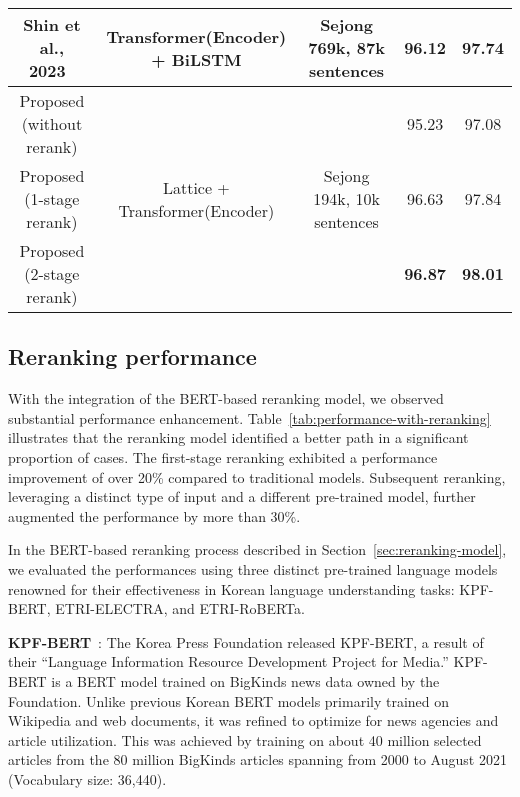 \documentclass[AMS,STIX2COL]{WileyNJD-v2}
\begin{document}
\begin{table*}[ht]
\begin{tabular*}{500pt}{@{\extracolsep\fill}ccc|cc@{\extracolsep\fill}}
            Shin et al., 2023~\cite{ShinHJ2023}   & Transformer(Encoder) + BiLSTM                   & Sejong 769k, 87k sentences                  & 96.12                      & 97.74                        \\
            \midrule
            Proposed (without rerank)             & \multirow{3}{*}{Lattice + Transformer(Encoder)} & \multirow{3}{*}{Sejong 194k, 10k sentences} & 95.23                      & 97.08                        \\
            Proposed (1-stage rerank)             & ~                                               & ~                                           & 96.63                      & 97.84                        \\
            Proposed (2-stage rerank)             & ~                                               & ~                                           & \textbf{96.87}             & \textbf{98.01}               \\
            \bottomrule
        \end{tabular*}
    \end{table*}

    \subsection{Reranking performance}\label{subsec:reranking-performance}

    With the integration of the BERT-based reranking model, we observed substantial performance enhancement.
    Table~\ref{tab:performance-with-reranking} illustrates that the reranking model identified a better path in a significant proportion of cases.
    The first-stage reranking exhibited a performance improvement of over 20\% compared to traditional models.
    Subsequent reranking, leveraging a distinct type of input and a different pre-trained model, further augmented the performance by more than 30\%.

    In the BERT-based reranking process described in Section~\ref{sec:reranking-model}, we evaluated the performances using three distinct pre-trained language models renowned for their effectiveness in Korean language understanding tasks: KPF-BERT, ETRI-ELECTRA, and ETRI-RoBERTa.

    \textbf{KPF-BERT}~\cite{KPF_BERT}: The Korea Press Foundation released KPF-BERT, a result of their ``Language Information Resource Development Project for Media.''
    KPF-BERT is a BERT model trained on BigKinds news data owned by the Foundation.
    Unlike previous Korean BERT models primarily trained on Wikipedia and web documents, it was refined to optimize for news agencies and article utilization.
    This was achieved by training on about 40 million selected articles from the 80 million BigKinds articles spanning from 2000 to August 2021 (Vocabulary size: 36,440).
\end{document}
